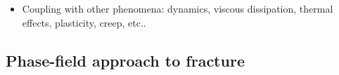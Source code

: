 \begin{frame}
\begin{overlayarea}{\textwidth}{0.32\textwidth}
\begin{itemize}
      \item<17-> Coupling with other phenomena: dynamics, viscous dissipation, thermal effects, plasticity, creep, etc..
    \end{itemize}
  \end{overlayarea}
  
\end{frame}

\subsection{Phase-field approach to fracture}


